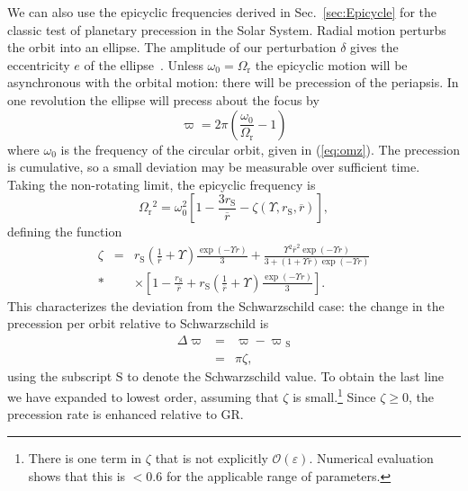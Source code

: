\documentclass[aps,prd,amsfonts,amssymb,amsmath,nofootinbib,reprint,showpacs]{revtex4-1}
\newcommand{\eqnref}[1]{(\ref{eq:#1})}
\newcommand{\secref}[1]{Sec.\ \ref{sec:#1}}
\newcommand{\sub}[1]{\ensuremath{_\text{#1}}}
\newcommand{\recip}[1]{\ensuremath{\frac{1}{#1}}}
\newcommand{\order}[1]{\ensuremath{\mathcal{O}({#1})}}
\begin{document}
We can also use the epicyclic frequencies derived in \secref{Epicycle} for the classic test of planetary precession in the Solar System. Radial motion perturbs the orbit into an ellipse. The amplitude of our perturbation $\delta$ gives the eccentricity $e$ of the ellipse~\cite{Kerner2001a}. Unless $\omega_0 = \Omega\sub{r}$ the epicyclic motion will be asynchronous with the orbital motion: there will be precession of the periapsis. In one revolution the ellipse will precess about the focus by
\begin{equation}
\varpi = 2\pi\left(\frac{\omega_0}{\Omega\sub{r}} - 1\right)
\end{equation}
where $\omega_0$ is the frequency of the circular orbit, given in \eqnref{omz}. The precession is cumulative, so a small deviation may be measurable over sufficient time. Taking the non-rotating limit, the epicyclic frequency is
\begin{equation}
\Omega\sub{r}^2 = \omega_0^2 \left[1 - \frac{3r\sub{S}}{\overline{r}} - \zeta(\Upsilon,r\sub{S},\overline{r})\right],
\end{equation}
defining the function
\begin{eqnarray}
\zeta & = & r\sub{S}\left(\recip{\overline{r}} + \Upsilon\right)\frac{\exp(-\Upsilon r)}{3} + \frac{\Upsilon^2\overline{r}^2\exp(-\Upsilon r)}{3 + (1 + \Upsilon \overline{r})\exp(-\Upsilon r)} \nonumber \\*
& &  \times \left[1 - \frac{r\sub{S}}{\overline{r}} + r\sub{S}\left(\recip{\overline{r}} + \Upsilon\right)\frac{\exp(-\Upsilon r)}{3}\right].
\end{eqnarray}
This characterizes the deviation from the Schwarzschild case: the change in the precession per orbit relative to Schwarzschild is
\begin{eqnarray}
\Delta \varpi & = & \varpi - \varpi\sub{S} \\
 & = & \pi\zeta,
\end{eqnarray}
using the subscript $\text{S}$ to denote the Schwarzschild value. To obtain the last line we have expanded to lowest order, assuming that $\zeta$ is small.\footnote{There is one term in $\zeta$ that is not explicitly $\order{\varepsilon}$. Numerical evaluation shows that this is $< 0.6$ for the applicable range of parameters.} Since $\zeta \geq 0$, the precession rate is enhanced relative to GR.
\end{document}
